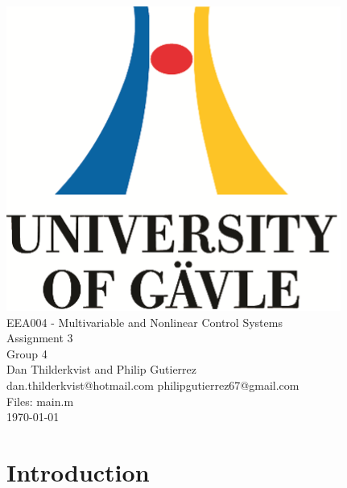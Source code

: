 \documentclass[a4paper, titlepage]{article}
\begin{document}

\begin{titlepage}
  \begin{center}
    \vspace*{1cm}
    \includegraphics[scale=1.0]{../figures/hig_logo_eng.png}\\
    \vspace{1.5cm}
    \large EEA004 - Multivariable and Nonlinear Control Systems\\
    \large Assignment 3\\
    \vspace{1.5cm}
    Group 4\\
    Dan Thilderkvist and Philip Gutierrez\\
    dan.thilderkvist@hotmail.com philipgutierrez67@gmail.com\\
    Files: main.m\\
    
    \vspace{1cm}
    \today
  \end{center}
\end{titlepage}

\tableofcontents
\clearpage



\section{Introduction}
\end{document}
